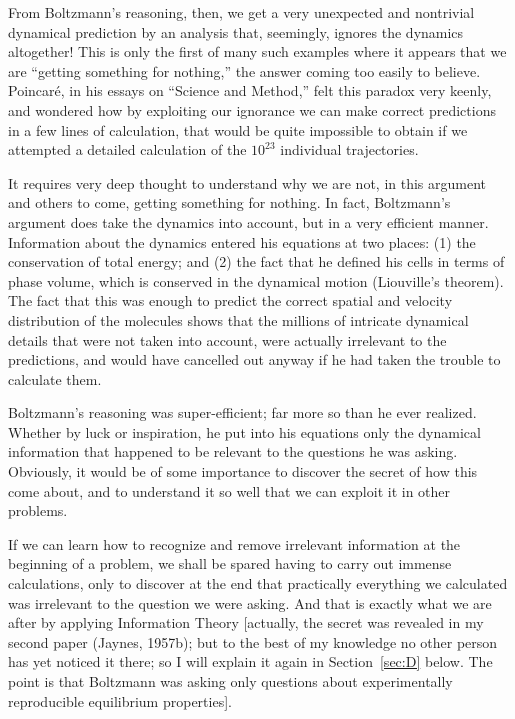 From Boltzmann's reasoning, then, we get a very unexpected and nontrivial dynamical prediction by an analysis that, seemingly, ignores the dynamics altogether!
This is only the first of many such examples where it appears that we are ``getting something for nothing,'' the answer coming too easily to believe.
Poincaré, in his essays on ``Science and Method,'' felt this paradox very keenly, and wondered how by exploiting our ignorance we can make correct predictions in a few lines of calculation, that would be quite impossible to obtain if we attempted a detailed calculation of the $10^{23}$ individual trajectories.

It requires very deep thought to understand why we are not, in this argument and others to come, getting something for nothing.
In fact, Boltzmann's argument does take the dynamics into account, but in a very efficient manner.
Information about the dynamics entered his equations at two places: (1) the conservation of total energy; and (2) the fact that he defined his cells in terms of phase volume, which is conserved in the dynamical motion (Liouville's theorem).
The fact that this was enough to predict the correct spatial and velocity distribution of the molecules shows that the millions of intricate dynamical details that were not taken into account, were actually irrelevant to the predictions, and would have cancelled out anyway if he had taken the trouble to calculate them.

Boltzmann's reasoning was super-efficient; far more so than he ever realized.
Whether by luck or inspiration, he put into his equations only the dynamical information that happened to be relevant to the questions he was asking.
Obviously, it would be of some importance to discover the secret of how this come about, and to understand it so well that we can exploit it in other problems.

If we can learn how to recognize and remove irrelevant information at the beginning of a problem, we shall be spared having to carry out immense calculations, only to discover at the end that practically everything we calculated was irrelevant to the question we were asking.
And that is exactly what we are after by applying Information Theory [actually, the secret was revealed in my second paper (Jaynes, \cite{jaynes57}{1957b}); but to the best of my knowledge no other person has yet noticed it there; so I will explain it again in Section~\ref{sec:D} below.
The point is that Boltzmann was asking only questions about experimentally reproducible equilibrium properties].

